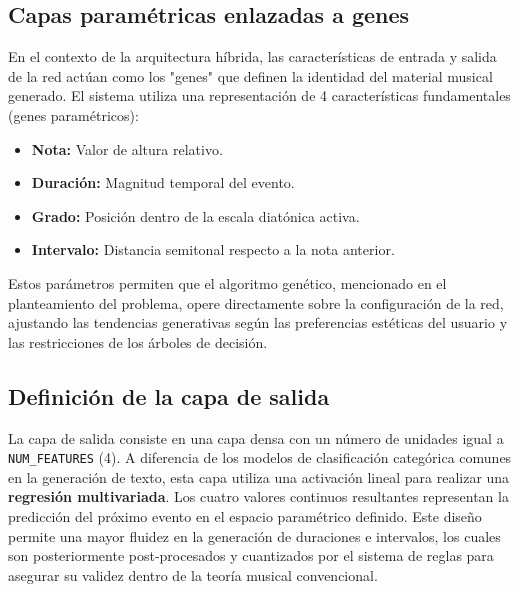 \subsection{Capas paramétricas enlazadas a genes}
En el contexto de la arquitectura híbrida, las características de entrada y salida de la red actúan como los "genes" que definen la identidad del material musical generado. El sistema utiliza una representación de 4 características fundamentales (genes paramétricos):
\begin{itemize}
    \item \textbf{Nota:} Valor de altura relativo.
    \item \textbf{Duración:} Magnitud temporal del evento.
    \item \textbf{Grado:} Posición dentro de la escala diatónica activa.
    \item \textbf{Intervalo:} Distancia semitonal respecto a la nota anterior.
\end{itemize}
Estos parámetros permiten que el algoritmo genético, mencionado en el planteamiento del problema, opere directamente sobre la configuración de la red, ajustando las tendencias generativas según las preferencias estéticas del usuario y las restricciones de los árboles de decisión.

\subsection{Definición de la capa de salida}
La capa de salida consiste en una capa densa con un número de unidades igual a \texttt{NUM\_FEATURES} (4). A diferencia de los modelos de clasificación categórica comunes en la generación de texto, esta capa utiliza una activación lineal para realizar una \textbf{regresión multivariada}. Los cuatro valores continuos resultantes representan la predicción del próximo evento en el espacio paramétrico definido. Este diseño permite una mayor fluidez en la generación de duraciones e intervalos, los cuales son posteriormente post-procesados y cuantizados por el sistema de reglas para asegurar su validez dentro de la teoría musical convencional.

